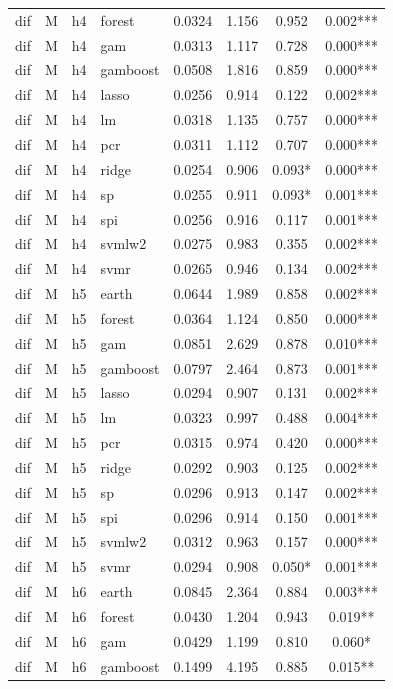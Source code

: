 \begin{ThreePartTable}
\begin{longtable}[t]{llclcccc}
dif & M & h4 & forest & 0.0324 & 1.156 & 0.952 & 0.002***\\
dif & M & h4 & gam & 0.0313 & 1.117 & 0.728 & 0.000***\\
dif & M & h4 & gamboost & 0.0508 & 1.816 & 0.859 & 0.000***\\
dif & M & h4 & lasso & 0.0256 & 0.914 & 0.122 & 0.002***\\
dif & M & h4 & lm & 0.0318 & 1.135 & 0.757 & 0.000***\\
dif & M & h4 & pcr & 0.0311 & 1.112 & 0.707 & 0.000***\\
dif & M & h4 & ridge & 0.0254 & 0.906 & 0.093* & 0.000***\\
dif & M & h4 & sp & 0.0255 & 0.911 & 0.093* & 0.001***\\
dif & M & h4 & spi & 0.0256 & 0.916 & 0.117 & 0.001***\\
dif & M & h4 & svmlw2 & 0.0275 & 0.983 & 0.355 & 0.002***\\
dif & M & h4 & svmr & 0.0265 & 0.946 & 0.134 & 0.002***\\
\addlinespace
dif & M & h5 & earth & 0.0644 & 1.989 & 0.858 & 0.002***\\
dif & M & h5 & forest & 0.0364 & 1.124 & 0.850 & 0.000***\\
dif & M & h5 & gam & 0.0851 & 2.629 & 0.878 & 0.010***\\
dif & M & h5 & gamboost & 0.0797 & 2.464 & 0.873 & 0.001***\\
dif & M & h5 & lasso & 0.0294 & 0.907 & 0.131 & 0.002***\\
dif & M & h5 & lm & 0.0323 & 0.997 & 0.488 & 0.004***\\
dif & M & h5 & pcr & 0.0315 & 0.974 & 0.420 & 0.000***\\
dif & M & h5 & ridge & 0.0292 & 0.903 & 0.125 & 0.002***\\
dif & M & h5 & sp & 0.0296 & 0.913 & 0.147 & 0.002***\\
dif & M & h5 & spi & 0.0296 & 0.914 & 0.150 & 0.001***\\
dif & M & h5 & svmlw2 & 0.0312 & 0.963 & 0.157 & 0.000***\\
dif & M & h5 & svmr & 0.0294 & 0.908 & 0.050* & 0.001***\\
\addlinespace
dif & M & h6 & earth & 0.0845 & 2.364 & 0.884 & 0.003***\\
dif & M & h6 & forest & 0.0430 & 1.204 & 0.943 & 0.019**\\
dif & M & h6 & gam & 0.0429 & 1.199 & 0.810 & 0.060*\\
dif & M & h6 & gamboost & 0.1499 & 4.195 & 0.885 & 0.015**\\

\end{longtable}
\end{ThreePartTable}
